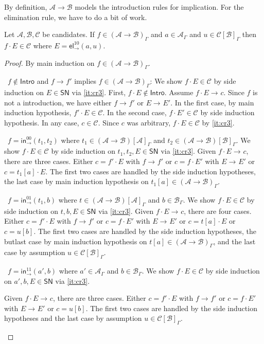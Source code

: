 \documentclass[a4paper,USenglish,cleveref, autoref, thm-restate]{lipics-v2019}
\newenvironment{caselist}{%
  \begin{list}{{\it Case}}{%
  }%
}{\end{list}%
}
\newcommand{\nextcase}{\item~}
\newcommand{\tin}{\ensuremath{\mathsf{in}}}
\newcommand{\inn}[2]{\ensuremath{\tin_{#1}^{#2}}}
\newcommand{\tel}{\mathsf{el}}
\newcommand{\el}[2]{\ensuremath{\tel_{#1}^{#2}}}
\newcommand{\red}[1][]{\longrightarrow_{#1}}
\newcommand{\A}{\mathcal{A}}
\newcommand{\B}{\mathcal{B}}
\newcommand{\C}{\mathcal{C}}
\newcommand{\SN}{\mathsf{SN}}
\newcommand{\Intro}{\mathsf{Intro}}
\begin{document}
By definition, $\A \to \B$ models the introduction rules for
implication.  For the elimination rule, we have to do a bit of work.
\begin{lemma}
  \label{lem:app}
  Let $\A,\B,\C$ be candidates.
  If $f \in (\A \to \B)_\Gamma$ and $a \in \A_\Gamma$ and
  $u \in \C[\B]_\Gamma$ then $f \cdot E \in \C$
  where $E = \el\to{10}(a,u)$.
\end{lemma}
\begin{proof}
  By main induction on $f \in (\A \to \B)_\Gamma$.
  \begin{caselist}

    \nextcase $f \not\in \Intro$ and $f \red f'$ implies
    $f \in (\A \to \B)_\Gamma$:
    We show $f \cdot E \in \C$ by side induction on $E \in \SN$ via \ref{it:cr3}.
    First, $f \cdot E \not\in\Intro$.
    Assume $f \cdot E \red c$.  Since $f$ is not a introduction, we
    have either $f \red f'$ or $E \red E'$.  In the first case, by
    main induction hypothesis, $f' \cdot E \in \C$.
    In the second case, $f \cdot E' \in \C$ by side induction hypothesis.
    In any case, $c \in \C$.  Since $c$ was arbitrary, $f \cdot E \in
    \C$ by \ref{it:cr3}.

    \nextcase $f = \inn\to{00}(t_1,t_2)$ where
    $t_1 \in (\A \to \B)[\A]_\Gamma$ and
    $t_2 \in (\A \to \B)[\B]_\Gamma$.
    We show $f \cdot E \in \C$ by side induction on $t_1,t_2,E \in
    \SN$ via \ref{it:cr3}.
    Given $f \cdot E \red c$, there are three cases.  Either $c = f' \cdot
    E$ with $f \red f'$ or $c = f \cdot E'$ with $E \red E'$ or $c =
    t_1[a] \cdot E$.  The first two cases are handled by the side
    induction hypotheses, the last case by main induction hypothesis
    on $t_1[a] \in (\A \to \B)_\Gamma$.

    \nextcase $f = \inn\to{01}(t_1,b)$ where
    $t \in (\A \to \B)[\A]_\Gamma$ and
    $b \in \B_\Gamma$.
    We show $f \cdot E \in \C$ by side induction on $t,b,E \in
    \SN$ via \ref{it:cr3}.
    Given $f \cdot E \red c$, there are four cases.  Either $c = f' \cdot
    E$ with $f \red f'$ or $c = f \cdot E'$ with $E \red E'$ or $c =
    t[a] \cdot E$ or $c = u[b]$.  The first two cases are handled by the side
    induction hypotheses, the butlast case by main induction hypothesis
    on $t[a] \in (\A \to \B)_\Gamma$, and the last case by assumption
    $u \in \C[\B]_\Gamma$.

    \nextcase $f = \inn\to{11}(a',b)$ where
    $a' \in \A_\Gamma$ and
    $b \in \B_\Gamma$.
    We show $f \cdot E \in \C$ by side induction on $a',b,E \in
    \SN$ via \ref{it:cr3}.

    Given $f \cdot E \red c$, there are three cases.  Either
    $c = f' \cdot E$ with $f \red f'$ or $c = f \cdot E'$ with
    $E \red E'$ or $c = u[b]$.  The first two cases are handled by the
    side induction hypotheses and the last case by
    assumption $u \in \C[\B]_\Gamma$.

  \end{caselist}
\end{proof}
\end{document}
